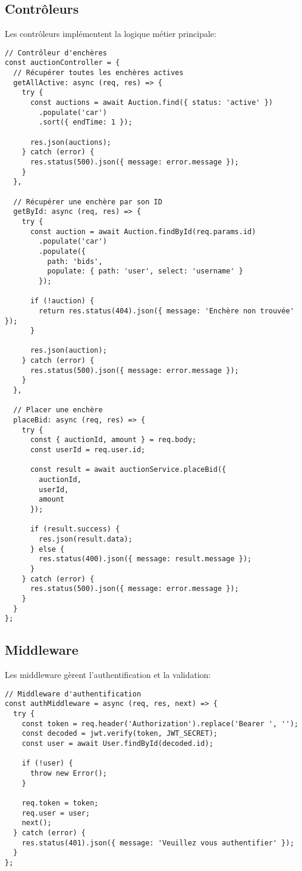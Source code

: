 \subsection{Contrôleurs}
Les contrôleurs implémentent la logique métier principale:

\begin{verbatim}
// Contrôleur d'enchères
const auctionController = {
  // Récupérer toutes les enchères actives
  getAllActive: async (req, res) => {
    try {
      const auctions = await Auction.find({ status: 'active' })
        .populate('car')
        .sort({ endTime: 1 });
      
      res.json(auctions);
    } catch (error) {
      res.status(500).json({ message: error.message });
    }
  },
  
  // Récupérer une enchère par son ID
  getById: async (req, res) => {
    try {
      const auction = await Auction.findById(req.params.id)
        .populate('car')
        .populate({
          path: 'bids',
          populate: { path: 'user', select: 'username' }
        });
      
      if (!auction) {
        return res.status(404).json({ message: 'Enchère non trouvée' });
      }
      
      res.json(auction);
    } catch (error) {
      res.status(500).json({ message: error.message });
    }
  },
  
  // Placer une enchère
  placeBid: async (req, res) => {
    try {
      const { auctionId, amount } = req.body;
      const userId = req.user.id;
      
      const result = await auctionService.placeBid({
        auctionId,
        userId,
        amount
      });
      
      if (result.success) {
        res.json(result.data);
      } else {
        res.status(400).json({ message: result.message });
      }
    } catch (error) {
      res.status(500).json({ message: error.message });
    }
  }
};
\end{verbatim}

\subsection{Middleware}
Les middleware gèrent l'authentification et la validation:

\begin{verbatim}
// Middleware d'authentification
const authMiddleware = async (req, res, next) => {
  try {
    const token = req.header('Authorization').replace('Bearer ', '');
    const decoded = jwt.verify(token, JWT_SECRET);
    const user = await User.findById(decoded.id);
    
    if (!user) {
      throw new Error();
    }
    
    req.token = token;
    req.user = user;
    next();
  } catch (error) {
    res.status(401).json({ message: 'Veuillez vous authentifier' });
  }
};
\end{verbatim}

